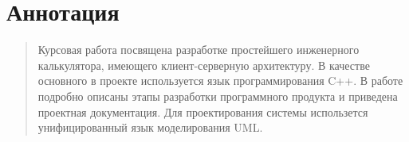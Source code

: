 \setcounter{page}{2}

\vspace*{1cm}
\section*{Аннотация}

\begin{quote} 
\hspace*{\parindent}
Курсовая работа посвящена разработке простейшего 
инженерного калькулятора, имеющего клиент-серверную архитектуру. 
В качестве основного в проекте используется язык программирования C++.
В работе подробно описаны этапы разработки программного продукта 
и приведена проектная документация. Для проектирования системы 
использется унифицированный язык моделирования UML.

\end{quote}

\vspace*{1cm}

\tableofcontents

\newpage
\endinput
